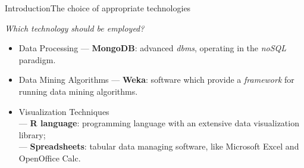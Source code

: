\begin{frame}{Introduction}{The choice of appropriate technologies}

	\centering\textit{Which technology should be employed?} \vspace{0,3cm}

	\begin{block}{}
	    \begin{itemize}
		    \item<1-> \alert{Data Processing} --- \textbf{MongoDB}: advanced \emph{dbms}, operating in the \emph{noSQL} paradigm.
		    \item<2-> \alert{Data Mining Algorithms} --- \textbf{Weka}: software which provide a \emph{framework} for running data mining algorithms.
			\item<3-> \alert{Visualization Techniques} \\
			--- \textbf{R language}: programming language with an extensive data visualization library; \\
			--- \textbf{Spreadsheets}: tabular data managing software, like Microsoft Excel and OpenOffice Calc.
	    \end{itemize}
    \end{block}

\end{frame}
